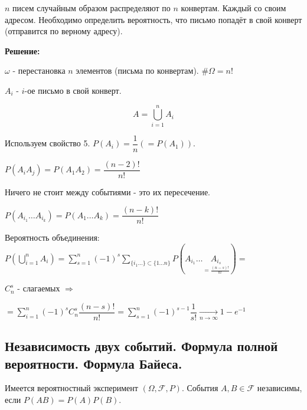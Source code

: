 \begin{exmp}
	$n$ писем случайным образом распределяют по $n$ конвертам. Каждый со своим адресом. Необходимо определить вероятность, что письмо попадёт в свой конверт (отправится по верному адресу).
	
	\textbf{Решение:}
	
	\noindent $\omega$ - перестановка $n$ элементов (письма по конвертам). $\# \Omega = n!$
	
	\noindent $A_i$ - $i$-ое письмо в свой конверт.
	
	\[ A = \bigcup_{i=1}^n A_i \]
	
	Используем свойство 5. $P(A_i) = \dfrac{1}{n} \left( = P(A_1) \right)$.
	
	\noindent $P(A_i A_j) = P(A_1 A_2) = \dfrac{(n-2)!}{n!}$
	
	\begin{remark}
		Ничего не стоит между событиями - это их пересечение.
	\end{remark}

	\noindent $P(A_{i_1} \dots A_{i_k}) = P(A_1 \dots A_k) = \dfrac{(n-k)!}{n!}$
	
	\noindent Вероятность объединения: $P\left( \bigcup\limits_{i=1}^n A_i \right) = \sum\limits_{s=1}^{n} (-1)^s \sum\limits_{\{ i_1 \dots \} \subset \{ 1 \dots n \}} P(A_{i_1} \dots \underset{= \frac{(n-s)!}{n!}}{A_{i_s}}) = $
	
	\noindent $C_n^s$ - слагаемых $\Rightarrow$
	
	\noindent $= \sum\limits_{i = 1}^n (-1)^s C_n^s \dfrac{(n-s)!}{n!} = \sum\limits_{s = 1}^n (-1)^{s-1} \dfrac{1}{s!} \underset{n \to \infty}{\to} 1 - e^{-1}$
\end{exmp}

\subsection{Независимость двух событий. Формула полной вероятности. Формула Байеса.}

\begin{definition}
	Имеется вероятностный эксперимент $(\Omega, \mathcal{F}, P)$. События $A, B \in \mathcal{F}$ независимы, если $P(AB) = P(A) P(B)$.
\end{definition}

